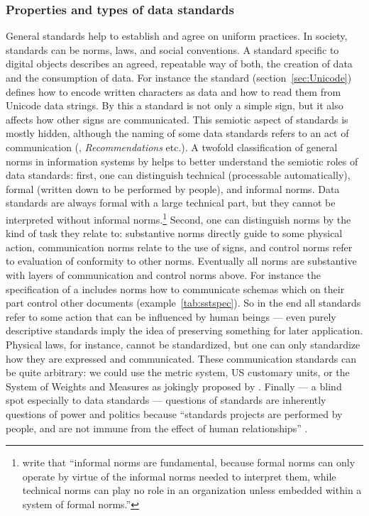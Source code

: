 \subsubsection{Properties and types of data standards}
\label{sec:dstypes}

General standards help to establish and agree on uniform practices. In society,
standards can be norms, laws, and social conventions. A standard specific to
digital objects describes an agreed, repeatable way of both, the creation of
data and the consumption of data.  For instance the  standard
(section~\ref{sec:Unicode}) defines how to encode written characters as data
and how to read them from Unicode data strings. By this a standard is not only
a simple sign, but it also affects how other signs are communicated. This
semiotic aspect of standards is mostly hidden, although the naming of some data
standards refers to an act of communication (,
 {\em Recommendations} etc.).  A twofold classification of general
norms in information systems by \textcite{Stamper2000} helps to better
understand the semiotic roles of data standards: first, one can distinguish
technical (processable automatically), formal (written down to be performed by
people), and informal norms. Data standards are always formal with a large
technical part, but they cannot be interpreted without informal
norms.\footnote{\textcite[p. 20]{Stamper2000} write that ``informal norms are
fundamental, because formal norms can only operate by virtue of the informal
norms needed to interpret them, while technical norms can play no role in an
organization unless embedded within a system of formal norms.''} Second, one
can distinguish norms by the kind of task they relate to: substantive norms
directly guide to some physical action, communication norms relate to the use
of signs, and control norms refer to evaluation of conformity to other norms.
Eventually all norms are substantive with layers of communication and control
norms above. For instance the specification of a 
includes norms how to communicate schemas which on their part control other
documents (example~\ref{tab:sstspec}).  So in the end all standards refer to some
action that can be influenced by human beings --- even purely descriptive
standards imply the idea of preserving something for later application.
Physical laws, for instance, cannot be standardized, but one can only
standardize how they are expressed and communicated. These communication
standards can be quite arbitrary: we could use the metric system, US customary
units, or the  System of Weights and Measures as jokingly
proposed by \textcite{Knuth1957}. Finally --- a blind spot especially to data
standards --- questions of standards are inherently questions of power and
politics because ``standards projects are performed by people, and are not
immune from the effect of human relationships'' \cite[p. 254]{Meek1995}.


